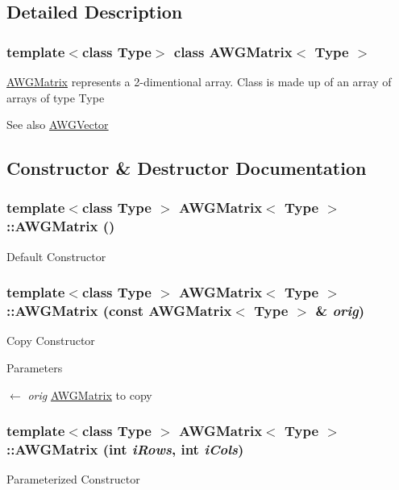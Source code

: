 \subsection{Detailed Description}
\subsubsection*{template$<$class Type$>$ class AWGMatrix$<$ Type $>$}

\hyperlink{classAWGMatrix}{AWGMatrix} represents a 2-\/dimentional array. Class is made up of an array of arrays of type Type

\begin{DoxySeeAlso}{See also}
\hyperlink{classAWGVector}{AWGVector} 
\end{DoxySeeAlso}


\subsection{Constructor \& Destructor Documentation}
\hypertarget{classAWGMatrix_a448480dff93d24168d109b93c7db3f2c}{
\subsubsection[{AWGMatrix}]{\setlength{\rightskip}{0pt plus 5cm}template$<$class Type $>$ {\bf AWGMatrix}$<$ Type $>$::{\bf AWGMatrix} ()}}
\label{classAWGMatrix_a448480dff93d24168d109b93c7db3f2c}
Default Constructor \hypertarget{classAWGMatrix_a31214755b0daaca36248e2ca794c776c}{
\subsubsection[{AWGMatrix}]{\setlength{\rightskip}{0pt plus 5cm}template$<$class Type $>$ {\bf AWGMatrix}$<$ Type $>$::{\bf AWGMatrix} (const {\bf AWGMatrix}$<$ Type $>$ \& {\em orig})}}
\label{classAWGMatrix_a31214755b0daaca36248e2ca794c776c}
Copy Constructor


\begin{DoxyParams}{Parameters}
\item[\mbox{$\leftarrow$} {\em orig}]\hyperlink{classAWGMatrix}{AWGMatrix} to copy \end{DoxyParams}
\hypertarget{classAWGMatrix_a7b3f96ca9aaad6bf1de3170db7225bd5}{
\subsubsection[{AWGMatrix}]{\setlength{\rightskip}{0pt plus 5cm}template$<$class Type $>$ {\bf AWGMatrix}$<$ Type $>$::{\bf AWGMatrix} (int {\em iRows}, \/  int {\em iCols})}}
\label{classAWGMatrix_a7b3f96ca9aaad6bf1de3170db7225bd5}
Parameterized Constructor


